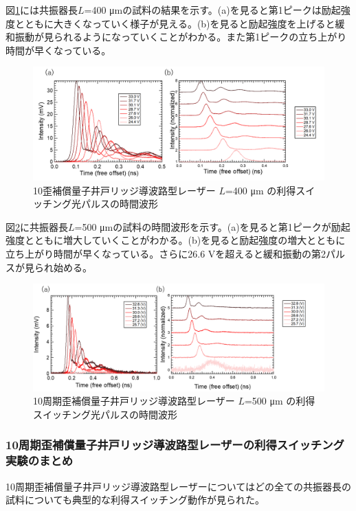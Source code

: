 {{図\ref{fig:fig_3_2_10QW_ridge_L400_GS}には共振器長$L$=400 \si{\micro\metre}の試料の結果を示す。(a)を見ると第1ピークは励起強度とともに大きくなっていく様子が見える。(b)を見ると励起強度を上げると緩和振動が見られるようになっていくことがわかる。また第1ピークの立ち上がり時間が早くなっている。
\begin{figure}[h]
	\centering
	\includegraphics[width=15cm]{figure/fig_3_2_10QW_ridge_L400_GS.png}
		\caption{10歪補償量子井戸リッジ導波路型レーザー $L$=400 \si{\micro\metre} の利得スイッチング光パルスの時間波形}
		\label{fig:fig_3_2_10QW_ridge_L400_GS}
\end{figure}

図\ref{fig:fig_3_2_10QW_ridge_L500_GS}に共振器長$L$=500 \si{\micro\metre}の試料の時間波形を示す。(a)を見ると第1ピークが励起強度とともに増大していくことがわかる。(b)を見ると励起強度の増大とともに立ち上がり時間が早くなっている。さらに26.6 Vを超えると緩和振動の第2パルスが見られ始める。
\begin{figure}[h]
	\centering
	\includegraphics[width=15cm]{figure/fig_3_2_10QW_ridge_L500_GS.png}
		\caption{10周期歪補償量子井戸リッジ導波路型レーザー $L$=500 \si{\micro\metre} の利得スイッチング光パルスの時間波形}
		\label{fig:fig_3_2_10QW_ridge_L500_GS}
\end{figure}

\newpage
\subsubsection{10周期歪補償量子井戸リッジ導波路型レーザーの利得スイッチング実験のまとめ}
10周期歪補償量子井戸リッジ導波路型レーザーについてはどの全ての共振器長の試料についても典型的な利得スイッチング動作が見られた。


}}
